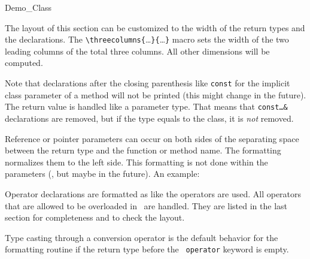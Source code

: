 \documentclass[12pt]{article}
\begin{document}
\begin{class}{Demo_Class}
{The layout of this section can be customized to the width of the
return types and the declarations. The
\verb"\threecolumns{"\ldots\verb"}{"\ldots\verb"}" macro sets the
width of the two leading columns of the total three columns. All other
dimensions will be computed.

Note that declarations after the closing parenthesis like {\tt const}
for the implicit class parameter of a method will not be printed
(this might change in the future).
The return value is handled like a parameter type. That means that
{\tt const\ldots\&} declarations are removed, but if the type equals
to the class, it is {\em not} removed.






Reference or pointer parameters can occur on both sides of the
separating space between the return type and the function or method
name. The formatting normalizes them to the left side. This
formatting is not done within the parameters (, but maybe in the
future). An example: 





Operator declarations are formatted as like the operators are
used.  All operators that are allowed to be overloaded in \CC\ are
handled. They are listed in the last section for completeness and
to check the layout. 

Type casting through a conversion operator is the default behavior 
for the formatting routine if the return type before the {\tt 
operator} keyword is empty.

}
\end{class}
\end{document}
